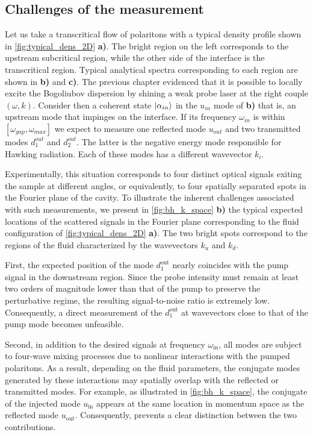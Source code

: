 \subsection{Challenges of the measurement}


Let us take a transcritical flow of polaritons with a typical density profile shown in \autoref{fig:typical_dens_2D} \textbf{a)}. The bright
region on the left corresponds to the upstream subcritical region, while the other side of the interface is the transcritical region. Typical analytical spectra corresponding to each region are shown in \textbf{b)} and \textbf{c)}.
The previous chapter evidenced that it is possible to locally excite the Bogoliubov dispersion by shining a weak probe laser at the right couple $(\omega, k)$. Consider then a coherent state
$\ket{\alpha_{in}}$ in the $u_{in}$ mode of \textbf{b)} that is, an upstream mode that impinges on the interface. If its frequency $\omega_{in}$ is within $[\omega_{gap}, \omega_{max}]$ we expect to measure one reflected mode $u_{out}$ and two transmitted modes $d_1^{out}$ and $d_2^{out}$. The latter is the negative
energy mode responsible for Hawking radiation. Each of these modes has a different wavevector $k_i$.

\bigskip


Experimentally, this situation corresponds to four distinct optical signals exiting the sample at different angles, or equivalently, to four spatially separated spots in the Fourier plane of the cavity. To illustrate the inherent challenges associated with such measurements, we present in \autoref{fig:bh_k_space} \textbf{b)} the typical expected locations of the scattered signals in the Fourier plane corresponding to the fluid configuration of \autoref{fig:typical_dens_2D} \textbf{a)}. The two bright spots correspond to the regions of the fluid characterized by the wavevectors \(k_u\) and \(k_d\). 

First, the expected position of the mode \(d_1^{\text{out}}\) nearly coincides with the pump signal in the downstream region. Since the probe intensity must remain at least two orders of magnitude lower than that of the pump to preserve the perturbative regime, the resulting signal-to-noise ratio is extremely low. Consequently, a direct measurement of the \(d_1^{\text{out}}\) at wavevectors close to that of the pump mode becomes unfeasible.

Second, in addition to the desired signals at frequency \(\omega_{\text{in}}\), all modes are subject to four-wave mixing processes due to nonlinear interactions with the pumped polaritons. As a result, depending on the fluid parameters, the conjugate modes generated by these interactions may spatially overlap with the reflected or transmitted modes. For example, as illustrated in \autoref{fig:bh_k_space}, the conjugate of the injected mode \(u_{\text{in}}\) appears at the same location in momentum space as the reflected mode \(u_{\text{out}}\). Consequently, prevents a clear distinction between the two contributions.

